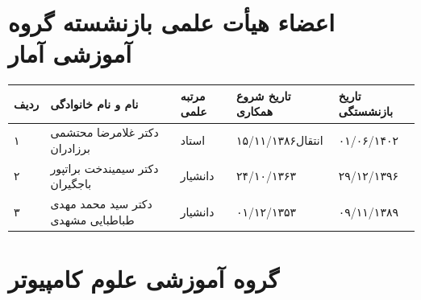\documentclass[
  letterpaper,
  DIV=11,
  numbers=noendperiod]{scrreprt}
\newcounter{none} %
\begin{document}
\section{اعضاء هیأت علمی بازنشسته گروه آموزشی
آمار}\label{ux627ux639ux636ux627ux621-ux647ux6ccux623ux62a-ux639ux644ux645ux6cc-ux628ux627ux632ux646ux634ux633ux62aux647-ux6afux631ux648ux647-ux622ux645ux648ux632ux634ux6cc-ux622ux645ux627ux631}

{\def\LTcaptype{none} %
\begin{longtable}[]{@{}
  >{\raggedright\arraybackslash}p{}
  >{\raggedright\arraybackslash}p{}
  >{\raggedright\arraybackslash}p{}
  >{\raggedright\arraybackslash}p{}
  >{\raggedright\arraybackslash}p{}@{}}
\toprule\noalign{}
\begin{minipage}[b]{\linewidth}\raggedright
ردیف
\end{minipage} & \begin{minipage}[b]{\linewidth}\raggedright
نام و نام خانوادگی
\end{minipage} & \begin{minipage}[b]{\linewidth}\raggedright
مرتبه علمی
\end{minipage} & \begin{minipage}[b]{\linewidth}\raggedright
تاریخ شروع همکاری
\end{minipage} & \begin{minipage}[b]{\linewidth}\raggedright
تاریخ بازنشستگی
\end{minipage} \\
\midrule\noalign{}
\endhead
\bottomrule\noalign{}
\endlastfoot
۱ & دکتر غلامرضا محتشمی برزادران & استاد & انتقال۱۵/۱۱/۱۳۸۶ &
۰۱/۰۶/۱۴۰۲ \\
۲ & دکتر سیمیندخت براتپور باجگیران & دانشیار & ۲۴/۱۰/۱۳۶۳ &
۲۹/۱۲/۱۳۹۶ \\
۳ & دکتر سید محمد مهدی طباطبایی مشهدی & دانشیار & ۰۱/۱۲/۱۳۵۳ &
۰۹/۱۱/۱۳۸۹ \\
\end{longtable}
}

\section{گروه آموزشی علوم
کامپیوتر}\label{ux6afux631ux648ux647-ux622ux645ux648ux632ux634ux6cc-ux639ux644ux648ux645-ux6a9ux627ux645ux67eux6ccux648ux62aux631}
\end{document}

